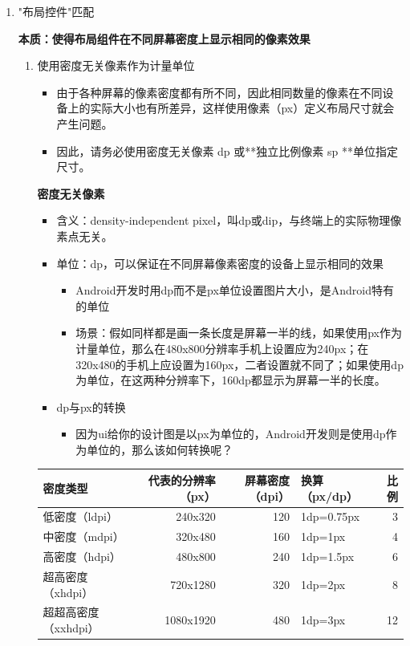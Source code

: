 \documentclass[9pt, b5paper]{article}
\begin{document}
\begin{enumerate}
\item "布局控件"匹配
\label{sec-1-6-2-1}

\textbf{本质：使得布局组件在不同屏幕密度上显示相同的像素效果}
\begin{enumerate}
\item 使用密度无关像素作为计量单位
\label{sec-1-6-2-1-1}
\begin{itemize}
\item 由于各种屏幕的像素密度都有所不同，因此相同数量的像素在不同设备上的实际大小也有所差异，这样使用像素（px）定义布局尺寸就会产生问题。
\item 因此，请务必使用密度无关像素 dp 或**独立比例像素 sp **单位指定尺寸。
\end{itemize}

\textbf{密度无关像素}
\begin{itemize}
\item 含义：density-independent pixel，叫dp或dip，与终端上的实际物理像素点无关。
\item 单位：dp，可以保证在不同屏幕像素密度的设备上显示相同的效果
\begin{itemize}
\item Android开发时用dp而不是px单位设置图片大小，是Android特有的单位
\item 场景：假如同样都是画一条长度是屏幕一半的线，如果使用px作为计量单位，那么在480x800分辨率手机上设置应为240px；在320x480的手机上应设置为160px，二者设置就不同了；如果使用dp为单位，在这两种分辨率下，160dp都显示为屏幕一半的长度。
\end{itemize}
\item dp与px的转换
\begin{itemize}
\item 因为ui给你的设计图是以px为单位的，Android开发则是使用dp作为单位的，那么该如何转换呢？
\end{itemize}
\end{itemize}
\begin{center}
\begin{tabular}{lrrlr}
\hline
密度类型 & 代表的分辨率（px） & 屏幕密度（dpi） & 换算（px/dp） & 比例\\
\hline
低密度（ldpi） & 240x320 & 120 & 1dp=0.75px & 3\\
中密度（mdpi） & 320x480 & 160 & 1dp=1px & 4\\
高密度（hdpi） & 480x800 & 240 & 1dp=1.5px & 6\\
超高密度（xhdpi） & 720x1280 & 320 & 1dp=2px & 8\\
超超高密度（xxhdpi） & 1080x1920 & 480 & 1dp=3px & 12\\
\hline
\end{tabular}
\end{center}


\end{enumerate}
\end{enumerate}
\end{document}
